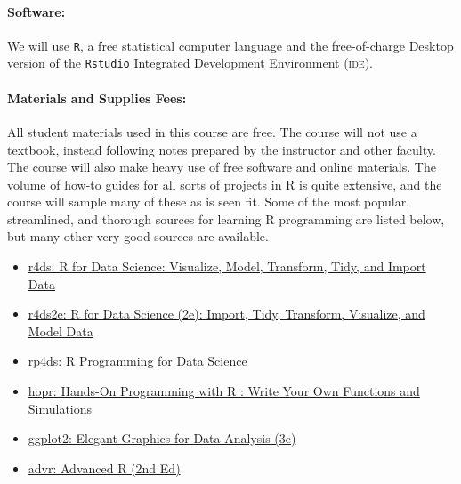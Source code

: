 \documentclass[11pt]{article}
\begin{document}
\paragraph{Software:}
We will use \href{https://cloud.r-project.org}{\texttt{R}}, a free statistical computer language and the free-of-charge Desktop version of the \href{https://posit.co/download/rstudio-desktop}{\texttt{Rstudio}} Integrated Development Environment (\textsc{ide}).

\paragraph{Materials and Supplies Fees:} 
All student materials used in this course are free. The course will not use a textbook, instead following notes prepared by the instructor and other faculty. The course will also make heavy use of free software and online materials. The volume of how-to guides for all sorts of projects in R is quite extensive, and the course will sample many of these as is seen fit. Some of the most popular, streamlined, and thorough sources for learning R programming are listed below, but many other very good sources are available.
	
\begin{itemize}
	\item \href{https://r4ds.had.co.nz}{r4ds: R for Data Science: Visualize, Model, Transform, Tidy, and Import Data}
	\item \href{https://r4ds.hadley.nz}{r4ds2e: R for Data Science (2e): Import, Tidy, Transform, Visualize, and Model Data}
	\item \href{https://bookdown.org/rdpeng/rprogdatascience}{rp4ds: R Programming for Data Science}
	\item \href{https://rstudio-education.github.io/hopr}{hopr: Hands-On Programming with R : Write Your Own Functions and Simulations}
	\item \href{https://ggplot2-book.org}{ggplot2: Elegant Graphics for Data Analysis (3e)}
	\item \href{https://adv-r.hadley.nz}{advr: Advanced R (2nd Ed)}
\end{itemize}
	
\end{document}

